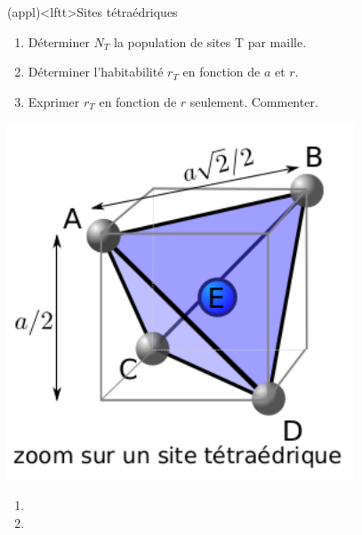 \documentclass[../../main/main.tex]{subfiles}
\begin{document}
\begin{tcb*}[breakable](appl)<lftt>{Sites tétraédriques}
	\begin{isd}[righthand ratio=.25]
		\begin{enumerate}[label=\sqenumi]
			\item Déterminer $N_T$ la population de sites T par maille.
			\item Déterminer l'habitabilité $r_T$ en fonction de $a$ et $r$.
			\item Exprimer $r_T$ en fonction de $r$ seulement. Commenter.
		\end{enumerate}
		\tcblower
		\begin{center}
			\includegraphics[width=\linewidth]{site_T_zoom.png}
		\end{center}
	\end{isd}
	\tcblower
	\begin{enumerate}[label=\sqenumi]
		\item {}
		\item
\end{enumerate}
\end{tcb*}
\end{document}
